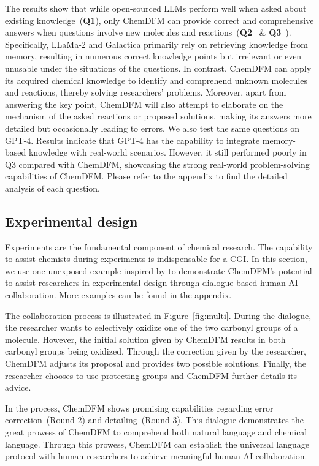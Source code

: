 The results show that while open-sourced LLMs perform well when asked about existing knowledge~(\textbf{Q1}), only ChemDFM can provide correct and comprehensive answers when questions involve new molecules and reactions~(\textbf{Q2}~\cite{yin2023total} \& \textbf{Q3}~\cite{dargo2023mesesamol}). Specifically, LLaMa-2 and Galactica primarily rely on retrieving knowledge from memory, resulting in numerous correct knowledge points but irrelevant or even unusable under the situations of the questions. In contrast, ChemDFM can apply its acquired chemical knowledge to identify and comprehend unknown molecules and reactions, thereby solving researchers' problems. Moreover, apart from answering the key point, ChemDFM will also attempt to elaborate on the mechanism of the asked reactions or proposed solutions, making its answers more detailed but occasionally leading to errors. We also test the same questions on GPT-4. Results indicate that GPT-4 has the capability to integrate memory-based knowledge with real-world scenarios. However, it still performed poorly in Q3 compared with ChemDFM, showcasing the strong real-world problem-solving capabilities of ChemDFM. 
Please refer to the appendix to find the detailed analysis of each question.

\subsection{Experimental design}\label{sec:multi}

Experiments are the fundamental component of chemical research. The capability to assist chemists during experiments is indispensable for a CGI. In this section, we use one unexposed example inspired by \citeauthor{yin2023total} to demonstrate ChemDFM's potential to assist researchers in experimental design through dialogue-based human-AI collaboration. More examples can be found in the appendix.

The collaboration process is illustrated in Figure~\ref{fig:multi}. During the dialogue, the researcher wants to selectively oxidize one of the two carbonyl groups of a molecule. However, the initial solution given by ChemDFM results in both carbonyl groups being oxidized. Through the correction given by the researcher, ChemDFM adjusts its proposal and provides two possible solutions. Finally, the researcher chooses to use protecting groups and ChemDFM further details its advice.

In the process, ChemDFM shows promising capabilities regarding error correction~(Round 2) and detailing~(Round 3).
This dialogue demonstrates the great prowess of ChemDFM to comprehend both natural language and chemical language. Through this prowess, ChemDFM can establish the universal language protocol with human researchers to achieve meaningful human-AI collaboration.

